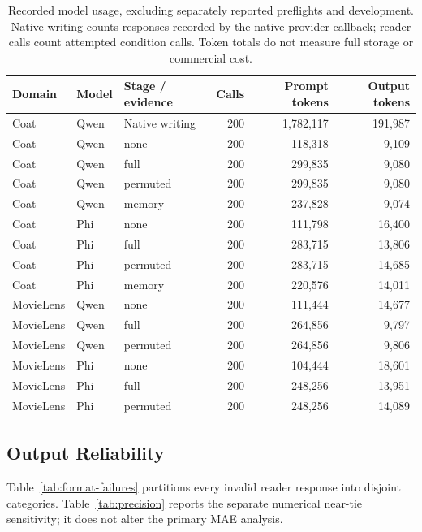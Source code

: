 \begin{table}[t]
\centering\small
\caption{Recorded model usage, excluding separately reported preflights and development. Native writing counts responses recorded by the native provider callback; reader calls count attempted condition calls. Token totals do not measure full storage or commercial cost.}
\label{tab:resources}
\begin{tabular}{lllrrr}
\toprule
Domain & Model & Stage / evidence & Calls & Prompt tokens & Output tokens\\
\midrule
Coat & Qwen & Native writing & 200 & 1,782,117 & 191,987\\
Coat & Qwen & none & 200 & 118,318 & 9,109\\
Coat & Qwen & full & 200 & 299,835 & 9,080\\
Coat & Qwen & permuted & 200 & 299,835 & 9,080\\
Coat & Qwen & memory & 200 & 237,828 & 9,074\\
Coat & Phi & none & 200 & 111,798 & 16,400\\
Coat & Phi & full & 200 & 283,715 & 13,806\\
Coat & Phi & permuted & 200 & 283,715 & 14,685\\
Coat & Phi & memory & 200 & 220,576 & 14,011\\
MovieLens & Qwen & none & 200 & 111,444 & 14,677\\
MovieLens & Qwen & full & 200 & 264,856 & 9,797\\
MovieLens & Qwen & permuted & 200 & 264,856 & 9,806\\
MovieLens & Phi & none & 200 & 104,444 & 18,601\\
MovieLens & Phi & full & 200 & 248,256 & 13,951\\
MovieLens & Phi & permuted & 200 & 248,256 & 14,089\\
\bottomrule
\end{tabular}
\end{table}

\subsection{Output Reliability}
Table~\ref{tab:format-failures} partitions every invalid reader response into disjoint categories. Table~\ref{tab:precision} reports the separate numerical near-tie sensitivity; it does not alter the primary MAE analysis.

